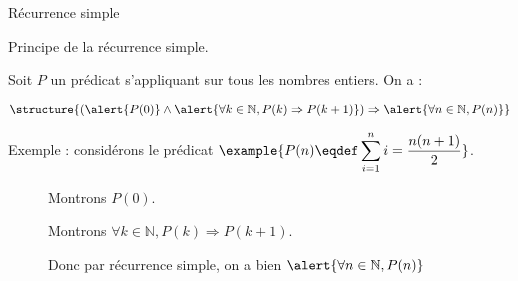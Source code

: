 
\begingroup

\begin{frame}{Récurrence simple}

  \begin{block}{Principe de la récurrence simple.}
    
    Soit $P$ un prédicat s'appliquant sur tous les nombres entiers. On a : 

    $$\structure{(\alert{P(0)} \land \alert{\forall k\in \mathbb{N}, P(k) \Rightarrow P(k+1)}) \Rightarrow \alert{\forall n\in \mathbb{N}, P(n)}}$$
  \end{block}

  \pause


  \begin{exampleblock}{Exemple :} 
    considérons le prédicat $\example{\displaystyle P(n) \eqdef \sum_{i = 1}^n i = \frac{n(n+1)}{2}}$.\\

    \begin{description}
    \item[] Montrons \alert{$P(0)$}.
    \item[] Montrons \alert{$\forall k\in \mathbb{N}, P(k) \Rightarrow P(k+1)$}.
    \item[] Donc par récurrence simple, on a bien $\alert{\forall n\in \mathbb{N}, P(n)}$
    \end{description}
  \end{exampleblock}
  
\end{frame}

\endgroup
